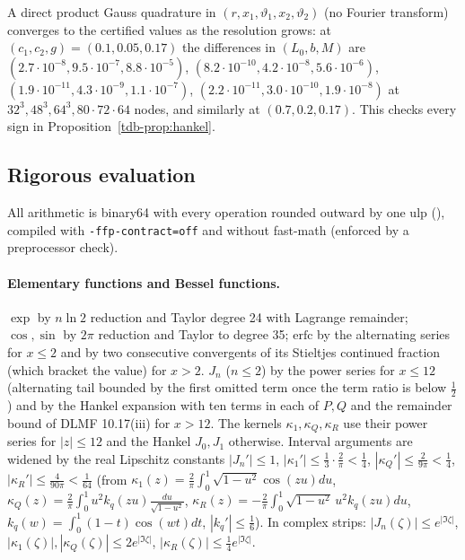 \begin{remark}
A direct product Gauss quadrature in $(r,x_1,\vartheta_1,x_2,\vartheta_2)$ (no Fourier transform) converges to the certified values as the
resolution grows: at $(c_1,c_2,g)=(0.1,0.05,0.17)$ the differences in $(L_0,b,M)$ are
$(2.7\cdot10^{-8},9.5\cdot10^{-7},8.8\cdot10^{-5})$, $(8.2\cdot10^{-10},4.2\cdot10^{-8},5.6\cdot10^{-6})$, $(1.9\cdot10^{-11},4.3\cdot10^{-9},1.1\cdot10^{-7})$,
$(2.2\cdot10^{-11},3.0\cdot10^{-10},1.9\cdot10^{-8})$ at $32^3,48^3,64^3,80\cdot72\cdot64$ nodes, and similarly at $(0.7,0.2,0.17)$.
This checks every sign in Proposition~\ref{tdb-prop:hankel}.
\end{remark}

\subsection{Rigorous evaluation}\label{tdb-sec:rig}
All arithmetic is binary64 with every operation rounded outward by one ulp (), compiled with \texttt{-ffp-contract=off}
and without fast-math (enforced by a preprocessor check).

\paragraph{Elementary functions and Bessel functions.} $\exp$ by $n\ln2$ reduction and Taylor degree 24 with Lagrange remainder;
$\cos,\sin$ by $2\pi$ reduction and Taylor to degree 35; $\mathrm{erfc}$ by the alternating series for $x\le2$ and by two consecutive convergents of
its Stieltjes continued fraction (which bracket the value) for $x>2$. $J_n$ ($n\le2$) by the power series for $x\le12$ (alternating tail
bounded by the first omitted term once the term ratio is below $\frac12$) and by the Hankel expansion with ten terms in each of $P,Q$
and the remainder bound of DLMF 10.17(iii) for $x>12$. The kernels $\kappa_1,\kappa_Q,\kappa_R$ use their power series for $|z|\le12$ and
the Hankel $J_0,J_1$ otherwise. Interval arguments are widened by the real Lipschitz constants $|J_n'|\le1$, $|\kappa_1'|\le\frac13\cdot\frac2\pi<\frac14$,
$|\kappa_Q'|\le\frac2{9\pi}<\frac14$, $|\kappa_R'|\le\frac{4}{90\pi}<\frac1{64}$ (from $\kappa_1(z)=\frac2\pi\int_0^1\sqrt{1-u^2}\cos(zu)du$,
$\kappa_Q(z)=\frac2\pi\int_0^1u^2k_q(zu)\frac{du}{\sqrt{1-u^2}}$, $\kappa_R(z)=-\frac2\pi\int_0^1\sqrt{1-u^2}\,u^2k_q(zu)du$, $k_q(w)=\int_0^1(1-t)\cos(wt)dt$,
$|k_q'|\le\frac16$). In complex strips: $|J_n(\zeta)|\le e^{|\Im\zeta|}$, $|\kappa_1(\zeta)|,|\kappa_Q(\zeta)|\le2e^{|\Im\zeta|}$, $|\kappa_R(\zeta)|\le\frac14e^{|\Im\zeta|}$.

